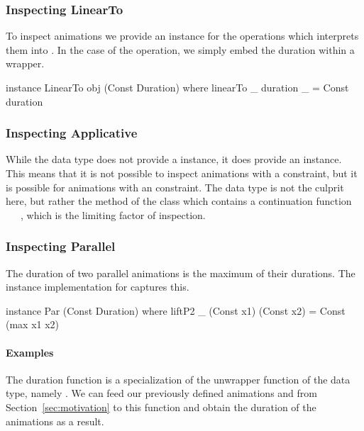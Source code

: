 \subsubsection{Inspecting LinearTo}

To inspect animations we provide an instance for the operations which
interprets them into . In the case of the 
operation, we simply embed the duration within a  wrapper.

\begin{code}
instance LinearTo obj (Const Duration) where
  linearTo _ duration _ = Const duration
\end{code}

\subsubsection{Inspecting Applicative}

While the  data type does not provide a  instance, it does
provide an  instance. This means that it is not possible to
inspect animations with a  constraint, but it is possible for
animations with an  constraint. The  data type is not
the culprit here, but rather the \hs{>>=} method of the  class which
contains a continuation function ~\hs{->}~~, which is the
limiting factor of inspection.

\subsubsection{Inspecting Parallel}

The duration of two parallel animations is the maximum of their durations. 
The  instance implementation for  captures
this. 

\begin{code}
instance Par (Const Duration) where
  liftP2 _ (Const x1) (Const x2) = Const (max x1 x2)
\end{code}

\paragraph{Examples}

The duration function is a specialization of the unwrapper function of the
 data type, namely . We can feed our previously defined
animations  and  from
Section~\ref{sec:motivation} to this function and obtain the duration of the
animations as a result.


